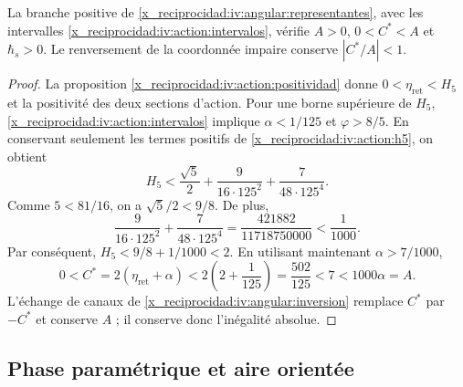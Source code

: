 \begin{proposition}
\label{x_reciprocidad:iv:ellipse:pertenencia}
La branche positive de \eqref{x_reciprocidad:iv:angular:representantes}, avec les
intervalles \eqref{x_reciprocidad:iv:action:intervalos}, vérifie
\(A>0\), \(0<C^*<A\) et \(\hbar_s>0\).
Le renversement de la coordonnée impaire conserve \(|C^*/A|<1\).
\end{proposition}
\begin{proof}
La proposition \ref{x_reciprocidad:iv:action:positividad} donne
\(0<\eta_{\mathrm{ret}}<H_5\) et la positivité des deux
sections d’action. Pour une borne supérieure de \(H_5\),
\eqref{x_reciprocidad:iv:action:intervalos} implique
\(\alpha<1/125\) et \(\varphi>8/5\). En conservant seulement
les termes positifs de \eqref{x_reciprocidad:iv:action:h5}, on obtient
\[
 H_5<
 \frac{\sqrt5}{2}+
 \frac{9}{16\cdot125^2}+
 \frac{7}{48\cdot125^4}.
\]
Comme \(5<81/16\), on a \(\sqrt5/2<9/8\). De plus,
\[
 \frac{9}{16\cdot125^2}+
 \frac{7}{48\cdot125^4}
 =\frac{421882}{11718750000}<\frac1{1000}.
\]
Par conséquent, \(H_5<9/8+1/1000<2\). En utilisant maintenant
\(\alpha>7/1000\),
\[
 0<C^*=2(\eta_{\mathrm{ret}}+\alpha)
 <2\left(2+\frac1{125}\right)=\frac{502}{125}
 <7<1000\alpha=A.
\]
L’échange de canaux de
\ref{x_reciprocidad:iv:angular:inversion} remplace \(C^*\) par \(-C^*\)
et conserve \(A\) ; il conserve donc l’inégalité absolue.
\end{proof}

\subsection{Phase paramétrique et aire orientée}
\label{x_reciprocidad:iv:ellipse:area}

